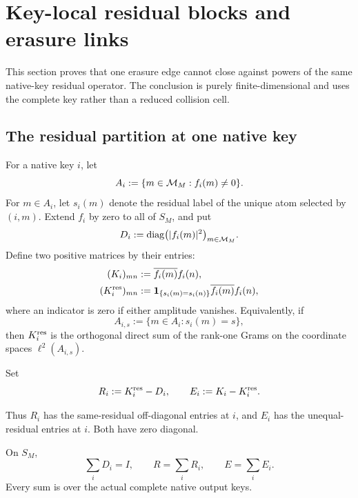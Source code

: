 \section{Key-local residual blocks and erasure links}
\label{sec:key-local}

This section proves that one erasure edge cannot close against powers of
the same native-key residual operator.  The conclusion is purely
finite-dimensional and uses the complete key rather than a reduced
collision cell.

\subsection{The residual partition at one native key}

For a native key \(i\), let
\[
 A_i:=\{m\in\mathcal M_M:f_i(m)\ne0\}.
\]
For \(m\in A_i\), let \(s_i(m)\) denote the residual label of the unique
atom selected by \((i,m)\).  Extend \(f_i\) by zero to all of \(S_M\), and
put
\begin{equation}
 D_i:=\operatorname{diag}\bigl(|f_i(m)|^2\bigr)_{m\in\mathcal M_M}.
 \label{eq:key-local-diagonal}
\end{equation}
Define two positive matrices by their entries:
\begin{align}
 (K_i)_{mn}
 &:=\overline{f_i(m)}f_i(n),
 \label{eq:key-native-Gram}\\
 (K_i^{\rm res})_{mn}
 &:=
 \mathbf 1_{\{s_i(m)=s_i(n)\}}
 \overline{f_i(m)}f_i(n),
 \label{eq:key-residual-Gram}
\end{align}
where an indicator is zero if either amplitude vanishes.  Equivalently,
if
\[
 A_{i,s}:=\{m\in A_i:s_i(m)=s\},
\]
then \(K_i^{\rm res}\) is the orthogonal direct sum of the rank-one Grams
on the coordinate spaces \(\ell^2(A_{i,s})\).

\begin{definition}
\label{def:key-local-defects}
Set
\begin{equation}
 R_i:=K_i^{\rm res}-D_i,
 \qquad
 E_i:=K_i-K_i^{\rm res}.
 \label{eq:key-local-defects}
\end{equation}
\end{definition}

Thus \(R_i\) has the same-residual off-diagonal entries at \(i\), and
\(E_i\) has the unequal-residual entries at \(i\).  Both have zero
diagonal.

\begin{proposition}
\label{prop:complete-key-decomposition}
On \(S_M\),
\begin{equation}
 \boxed{
 \sum_iD_i=I,\qquad
 R=\sum_iR_i,\qquad
 E=\sum_iE_i.}
 \label{eq:complete-key-decomposition}
\end{equation}
Every sum is over the actual complete native output keys.
\end{proposition}

